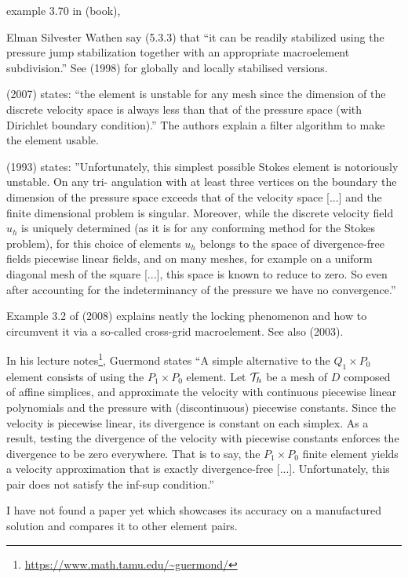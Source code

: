 example 3.70 in \textcite{john16} (book),


Elman Silvester Wathen say (5.3.3) that 
``it can be readily stabilized using the pressure jump
stabilization together with an appropriate macroelement subdivision.''
See \textcite{nosi98} (1998) for globally and locally stabilised versions. 

\textcite{qizh07b} (2007) states: ``the element is unstable for any mesh since
the dimension of the discrete velocity space is always less than that of the pressure space (with
Dirichlet boundary condition).'' The authors explain a filter algorithm to make the
element usable. 

\textcite{arno93} (1993) states: ''Unfortunately, this simplest possible Stokes element is notoriously unstable. On any tri-
angulation with at least three vertices on the boundary the dimension of the pressure
space exceeds that of the velocity space [...] and the finite
dimensional problem is singular. 
Moreover, while the discrete velocity field $u_h$ is uniquely
determined (as it is for any conforming method for the Stokes problem), for this choice of
elements $u_h$ belongs to the space of divergence-free fields piecewise linear fields, and on
many meshes, for example on a uniform diagonal mesh of the square [...],
this space is known to reduce to zero. So even after accounting for the indeterminancy of
the pressure we have no convergence.''

Example 3.2 of \textcite{bobf08} (2008) explains neatly the locking phenomenon and how 
to circumvent it via a so-called cross-grid macroelement. See also 
\textcite{hokl03} (2003).

In his lecture notes\footnote{\url{https://www.math.tamu.edu/~guermond/}}, 
Guermond states ``A simple alternative to the 
$Q_1\times P_0$ element consists of using the $P_1\times P_0$ element.
Let ${\cal T}_h$  be a mesh of $D$ composed of affine simplices, and approximate the 
velocity with continuous piecewise linear polynomials and the pressure with
(discontinuous) piecewise constants. Since the velocity is piecewise linear, its
divergence is constant on each simplex. As a result, testing the divergence
of the velocity with piecewise constants enforces the divergence to be zero
everywhere. That is to say, the $P_1\times P_0$ finite element yields a velocity 
approximation that is exactly divergence-free [...]. Unfortunately,
this pair does not satisfy the inf-sup condition.''

I have not found a paper yet which showcases its accuracy on a manufactured solution
and compares it to other element pairs.


